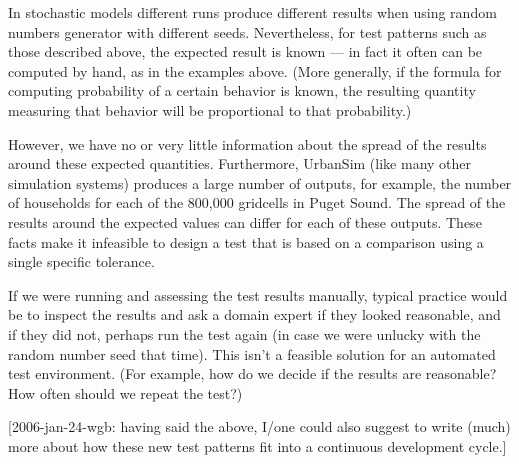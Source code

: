 In stochastic models different runs produce different results when using
random numbers generator with different seeds.  Nevertheless, for test
patterns such as those described above, the expected result is known --- in
fact it often can be computed by hand, as in the examples above.  (More
generally, if the formula for computing probability of a certain behavior
is known, the resulting quantity measuring that behavior will be
proportional to that probability.)

However, we have no or very little information about the spread of the
results around these expected quantities.  Furthermore, UrbanSim (like many
other simulation systems) produces a large number of outputs, for
example, the number of households for each of the
800,000 gridcells in Puget Sound.  The spread of the results around the expected values can
differ for each of these outputs.  These facts make it infeasible to design a
test that is based on a comparison using a single specific tolerance.

If we were running and assessing the test results manually, typical
practice would be to inspect the results and ask a domain expert if they
looked reasonable, and if they did not, perhaps run the test again (in case
we were unlucky with the random number seed that time).  This isn't a
feasible solution for an automated test environment.  (For example, how do
we decide if the results are reasonable?  How often should we repeat the
test?)

[2006-jan-24-wgb: having said the above, I/one could also suggest to write (much) more about how
these new test patterns fit into a continuous development cycle.]

